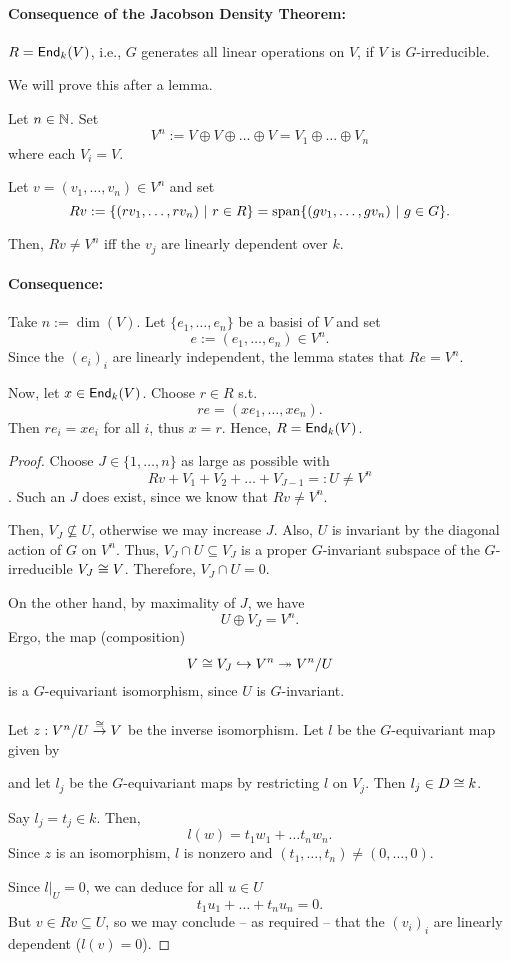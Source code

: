 \paragraph{Consequence of the Jacobson Density Theorem:} $R = \textsf{End}_k(V)$, i.e., $G$ generates all linear operations on $V$, if $V$ is $G$-irreducible.

We will prove this after a lemma.
\begin{lemma}
	Let $n \in \mathbb{N}$. Set
	\[ V^n := V \oplus V \oplus \ldots \oplus V = V_1 \oplus \ldots \oplus V_n \]
	where each $V_i = V$.
	
	Let $v = (v_1,\ldots, v_n) \in V^n$ and set
	\[ Rv := \left\lbrace(rv_1, \ldots, rv_n) ~ | ~  r \in R \right\rbrace = \mathrm{span} \{ (gv_1, \ldots, gv_n) ~|~ g \in G \}. \]
	
	Then, $Rv\neq V^n$ iff the $v_j$ are linearly dependent over $k$.
\end{lemma}
\paragraph{Consequence: } Take $n := \dim(V)$. Let $\{e_1, \ldots, e_n\}$ be a basisi of $V$ and set
\[ e := (e_1, \ldots, e_n) \in V^n. \]
Since the $(e_i)_i$ are linearly independent, the lemma states that $Re = V^n$.

Now, let $x \in \textsf{End}_k(V)$. Choose $r \in R$ s.t.
\[re = (xe_1, \ldots, xe_n). \]
Then $re_i = xe_i$ for all $i$, thus $x = r$. Hence, $R = \textsf{End}_k(V)$.
\begin{proof}
Choose $J \in \{1, \ldots, n\}$ as large as possible with
\[ Rv + V_1 + V_2 + \ldots + V_{J-1} =: U \neq V^n \].
Such an $J$ does exist, since we know that $Rv \neq V^n$.

Then, $V_J \not\subseteq U$, otherwise we may increase $J$. Also, $U$ is invariant by the diagonal action of $G$ on $V^n$.
Thus, $V_J \cap U \subseteq V_J$ is a proper $G$-invariant subspace of the $G$-irreducible $V_J \overset{}{\cong} V$. Therefore, $V_J \cap U = 0$.

On the other hand, by maximality of $J$, we have
\[ U \oplus V_J = V^n. \]
Ergo, the map (composition)
\[ V\overset{}{\cong} V_J \overset{}{\hookrightarrow} V^n \overset{}{\twoheadrightarrow} V^n/ U  \]
is a $G$-equivariant isomorphism, since $U$ is $G$-invariant.

Let $z : V^n / U \overset{\overset{}{\cong}}{\rightarrow} V$ be the inverse isomorphism. Let $l$ be the $G$-equivariant map given by
\begin{center}
\end{center}
and let $l_j$ be the $G$-equivariant maps by restricting $l$ on $V_j$. Then $l_j \in D \overset{}{\cong} k$.

Say $l_j = t_j \in k$. Then, 
\[ l(w) = t_1 w_1 + \ldots t_nw_n. \]
Since $z$ is an isomorphism, $l$ is nonzero and $(t_1, \ldots, t_n) \neq (0,\ldots, 0)$.

Since $l|_U = 0$, we can deduce for all $u \in U$
\[ t_1u_1+ \ldots + t_nu_n = 0. \]
But $v \in Rv \subseteq U$, so we may conclude -- as required -- that the $(v_i)_i$ are linearly dependent ($l(v) = 0$).
\end{proof}

